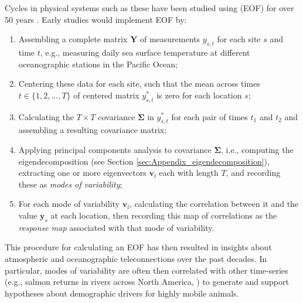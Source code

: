 Cycles in physical systems such as these have been studied using  (EOF) for over 50 years \cite{grimmer_space-filtering_1963,kidson_eigenvector_1975}.  Early studies would implement EOF by:
\begin{enumerate}
    \item Assembling a complete matrix \(\mathbf{Y}\) of measurements \(y_{s,t}\) for each site \(s\) and time \(t\), e.g., measuring daily sea surface temperature at different oceanographic stations in the Pacific Ocean;

    \item Centering these data for each site, such that the mean across times \(t \in \{ 1, 2, ..., T \}\) of centered matrix \(y^*_{s,t}\) is zero for each location \(s\);

    \item Calculating the \( T \times T \) covariance \(\mathbf{\Sigma} \) in \(y^*_{s,t}\) for each pair of times \(t_1\) and \(t_2\) and assembling a resulting covariance matrix;

    \item Applying principal components analysis to covariance \(\mathbf{\Sigma} \), i.e., computing the eigendecomposition (see Section \ref{sec:Appendix_eigendecomposition}), extracting one or more eigenvectors \(\mathbf{v}_l\) each with length \(T\), and recording these as \textit{modes of variability};
 
    \item For each mode of variability \(\mathbf{v}_l\), calculating the correlation between it and the value \(\mathbf{y}_{s}\) at each location, then recording this map of correlations as the \textit{response map} associated with that mode of variability.
\end{enumerate}
This procedure for calculating an EOF has then resulted in insights about atmospheric and oceanographic teleconnections over the past decades.  In particular, modes of variability are often then correlated with other time-series (e.g., salmon returns in rivers across North America, \cite{mantua_pacific_1997}) to generate and support hypotheses about demographic drivers for highly mobile animals. 

